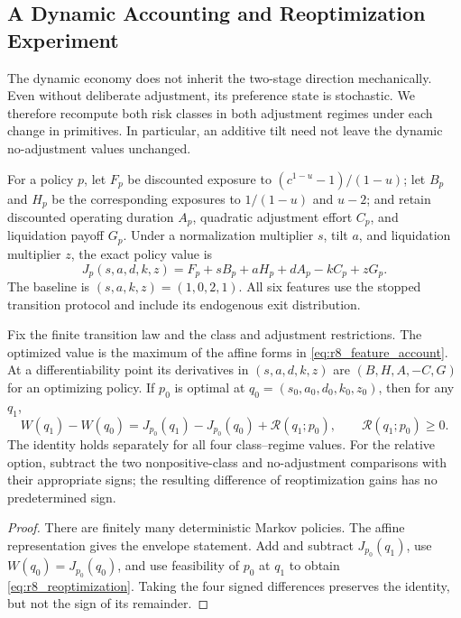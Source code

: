 \subsection{A Dynamic Accounting and Reoptimization Experiment}
\label{subsec:r8_dynamic}
The dynamic economy does not inherit the two-stage direction mechanically. Even without deliberate adjustment, its preference state is stochastic. We therefore recompute both risk classes in both adjustment regimes under each change in primitives. In particular, an additive tilt need not leave the dynamic no-adjustment values unchanged.

For a policy $p$, let $F_p$ be discounted exposure to $(c^{1-u}-1)/(1-u)$; let $B_p$ and $H_p$ be the corresponding exposures to $1/(1-u)$ and $u-2$; and retain discounted operating duration $A_p$, quadratic adjustment effort $C_p$, and liquidation payoff $G_p$. Under a normalization multiplier $s$, tilt $a$, and liquidation multiplier $z$, the exact policy value is
\begin{equation}
 J_p(s,a,d,k,z)=F_p+sB_p+aH_p+dA_p-kC_p+zG_p.
 \label{eq:r8_feature_account}
\end{equation}
The baseline is $(s,a,k,z)=(1,0,2,1)$. All six features use the stopped transition protocol and include its endogenous exit distribution.

\begin{proposition}
\label{prop:r8_mechanisms}
Fix the finite transition law and the class and adjustment restrictions. The optimized value is the maximum of the affine forms in \eqref{eq:r8_feature_account}. At a differentiability point its derivatives in $(s,a,d,k,z)$ are $(B,H,A,-C,G)$ for an optimizing policy. If $p_0$ is optimal at $q_0=(s_0,a_0,d_0,k_0,z_0)$, then for any $q_1$,
\begin{equation}
 W(q_1)-W(q_0)
 =J_{p_0}(q_1)-J_{p_0}(q_0)+\mathcal R(q_1;p_0),
 \qquad \mathcal R(q_1;p_0)\geq0.
 \label{eq:r8_reoptimization}
\end{equation}
The identity holds separately for all four class--regime values. For the relative option, subtract the two nonpositive-class and no-adjustment comparisons with their appropriate signs; the resulting difference of reoptimization gains has no predetermined sign.
\end{proposition}
\begin{proof}
There are finitely many deterministic Markov policies. The affine representation gives the envelope statement. Add and subtract $J_{p_0}(q_1)$, use $W(q_0)=J_{p_0}(q_0)$, and use feasibility of $p_0$ at $q_1$ to obtain \eqref{eq:r8_reoptimization}. Taking the four signed differences preserves the identity, but not the sign of its remainder.
\end{proof}

